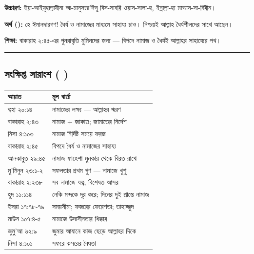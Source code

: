 \textbf{উচ্চারণ:} ইয়া-আইয়ুহাল্লাযীনা আ-মানুসতা'ঈনূ বিস-সাবরি ওয়াস-সালা-হ, ইন্নাল্লা-হা মাআস-সা-বিরীন।

\textbf{অর্থ ():} হে ঈমানদারগণ! ধৈর্য ও নামাজের মাধ্যমে সাহায্য চাও। নিশ্চয়ই আল্লাহ ধৈর্যশীলদের সাথে আছেন।

\textbf{শিক্ষা:} বাকারাহ ২:৪৫-এর পুনরাবৃত্তি মুমিনদের জন্য — বিপদে নামাজ ও ধৈর্যই আল্লাহর সাহায্যের পথ।

\medskip\hrule\medskip

\subsection*{সংক্ষিপ্ত সারাংশ ( )}

\begin{table}[h]\centering\small
\begin{tabular}{ll}
আয়াত & মূল বার্তা \\
\hline
ত্বহা ২০:১৪ & নামাজের লক্ষ্য — আল্লাহর স্মরণ \\
বাকারাহ ২:৪৩ & নামাজ + জাকাত; জামাতের নির্দেশ \\
নিসা ৪:১০৩ & নামাজ নির্দিষ্ট সময়ে ফরজ \\
বাকারাহ ২:৪৫ & বিপদে ধৈর্য ও নামাজের সাহায্য \\
আনকাবুত ২৯:৪৫ & নামাজ ফাহেশা-মুনকার থেকে বিরত রাখে \\
মু'মিনুন ২৩:১-২ & সফলতার প্রথম গুণ — নামাজে খুশু \\
বাকারাহ ২:২৩৮ & সব নামাজে যত্ন, বিশেষত আসর \\
হুদ ১১:১১৪ & নেকি মন্দকে দূর করে; দিনের দুই প্রান্তে নামাজ \\
ইসরা ১৭:৭৮-৭৯ & সময়সীমা; ফজরের ফেরেশতা; তাহাজ্জুদ \\
মাউন ১০৭:৪-৫ & নামাজে উদাসীনতার ধিক্কার \\
জুমু'আ ৬২:৯ & জুমার আযানে কাজ ছেড়ে আল্লাহর দিকে \\
নিসা ৪:১০১ & সফরে কসরের বৈধতা \\
\hline
\end{tabular}
\end{table}



